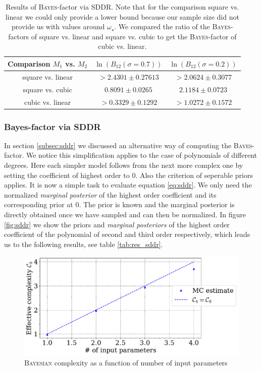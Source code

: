 \documentclass[%
 reprint,
 amsmath,amssymb,
 aps,
]{revtex4-1}
\begin{document}
\begin{table}[H]
		{\renewcommand{\arraystretch}{1.3}
			\begin{tabular}{|c|c|c|}
				\hline
				Comparison $M_1$ vs. $M_2$ & $\ln(B_{12}(\sigma=0.7))$ & $\ln(B_{12}(\sigma=0.2))$ \\
				\hline
				square vs. linear& $>2.4301\pm0.27613$&$>2.0624\pm0.3077$\\
				square vs. cubic&$0.8091\pm0.0265$  &$2.1184\pm0.0723$\\
				cubic vs. linear & $>0.3329\pm0.1292$&$>1.0272\pm0.1572$\\
				\hline
	\end{tabular}}
	\caption{Results of \textsc{Bayes}-factor via SDDR. Note that for the comparison square vs. linear we could only provide a lower bound because our sample size did not provide us with values around $\omega_\star$. We compared the ratio of the \textsc{Bayes}-factors of square vs. linear and square vs. cubic to get the \textsc{Bayes}-factor of cubic vs. linear.}
	\label{tab:res_sddr}
\end{table}
\subsubsection{\textbf{Bayes-factor via SDDR}}
\noindent In section \eqref{subsec:sddr} we discussed an alternative way of computing the \textsc{Bayes}-factor. We notice this simplification applies to the case of polynomials of different degrees. Here each simpler model follows from the next more complex one by setting the coefficient of highest order to $0$. Also the criterion of seperable priors applies. It is now a simple task to evaluate equation \eqref{eq:sddr}. We only need the normalized \emph{marginal posterior} of the highest order coefficient and its corresponding prior at $0$. The prior is known and the marginal posterior is directly obtained once we have sampled and can then be normalized. In figure \eqref{fig:sddr} we show the priors and \emph{marginal posteriors} of the highest order coefficient of the polynomial of second and third order respectively, which leads us to the following results, see table \eqref{tab:res_sddr}.

\begin{figure}[H]
	\centering
	\includegraphics[width=\linewidth]{_sigma_07acomplexity.pdf}
	\caption{\textsc{Bayesian} complexity as a function of number of input parameters}
	\label{fig:complex}
\end{figure}
\end{document}

